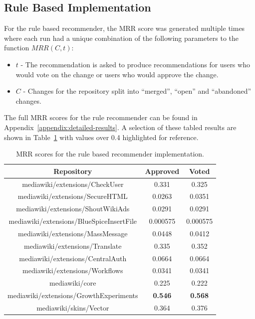 \subsection{Rule Based Implementation}

For the rule based recommender, the MRR score was generated multiple times where each run had a unique combination of the following parameters to the function \(MRR(C, t)\):
\begin{itemize}
    \item \(t\) - The recommendation is asked to produce recommendations for users who would vote on the change or users who would approve the change.
    \item \(C\) - Changes for the repository split into ``merged'', ``open'' and ``abandoned'' changes.
\end{itemize}

The full MRR scores for the rule recommender can be found in Appendix~\ref{appendix:detailed-results}.  A selection of these tabled results are shown in Table~\ref{table:rule-based-mrr-scores} with values over 0.4 highlighted for reference.

\begin{table}[H]
    \centering
    \begin{tabular}{@{}c c c@{}} 
 \hline
    \textbf{Repository} & \textbf{Approved} & \textbf{Voted} \\
\hline
mediawiki/extensions/CheckUser & 0.331 & 0.325 \\
mediawiki/extensions/SecureHTML & 0.0263 & 0.0351 \\
mediawiki/extensions/ShoutWikiAds & 0.0291 & 0.0291 \\
mediawiki/extensions/BlueSpiceInsertFile & 0.000575 & 0.000575 \\
mediawiki/extensions/MassMessage & 0.0448 & 0.0412 \\
mediawiki/extensions/Translate & 0.335 & 0.352 \\
mediawiki/extensions/CentralAuth & 0.0664 & 0.0664 \\
mediawiki/extensions/Workflows & 0.0341 & 0.0341 \\
mediawiki/core & 0.225 & 0.222 \\
mediawiki/extensions/GrowthExperiments & \textbf{0.546} & \textbf{0.568} \\
mediawiki/skins/Vector & 0.364 & 0.376 \\
\hline
\end{tabular}
    \caption{MRR scores for the rule based recommender implementation.}
    \label{table:rule-based-mrr-scores}
\end{table}

